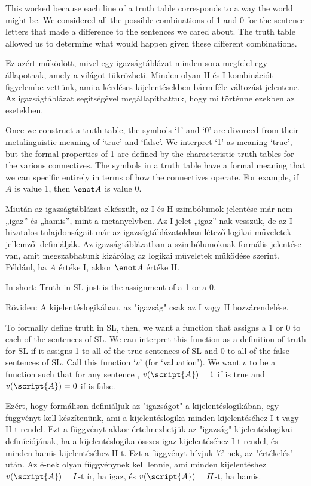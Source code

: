 This worked because each line of a truth table corresponds to a way the world might be. We considered all the possible combinations of 1 and 0 for the sentence letters that made a difference to the sentences we cared about. The truth table allowed us to determine what would happen given these different combinations. 

Ez azért működött, mivel egy igazságtáblázat minden sora megfelel egy állapotnak, amely a világot tükrözheti. Minden olyan H és I kombinációt figyelembe vettünk, ami a kérdéses kijelentésekben bármiféle változást jelentene. Az igazságtáblázat segítségével megállapíthattuk, hogy mi történne ezekben az esetekben.


Once we construct a truth table, the symbols `1' and `0' are divorced from their metalinguistic meaning of `true' and `false'. We interpret `1' as meaning `true', but the formal properties of 1 are defined by the characteristic truth tables for the various connectives. The symbols in a truth table have a formal meaning that we can specific entirely in terms of how the connectives operate. For example, if $A$ is value 1, then $\enot A$ is value 0.

Miután az igazságtáblázat elkészült, az I és H szimbólumok jelentése már nem „igaz” és „hamis”, mint a metanyelvben. Az I jelet „igaz”-nak vesszük, de az I hivatalos tulajdonságait már az igazságtáblázatokban létező logikai műveletek jellemzői definiálják. Az igazságtáblázatban a szimbólumoknak formális jelentése van, amit megszabhatunk kizárólag az logikai műveletek működése szerint. Például, ha $A$ értéke I, akkor $\enot A$ értéke H.


In short: Truth in SL just is the assignment of a 1 or a 0.

Röviden: A kijelentéslogikában, az "igazság" csak az I vagy H hozzárendelése.


To formally define truth in SL, then, we want a function that assigns a 1 or 0 to each of the sentences of SL. We can interpret this function as a definition of truth for SL if it assigns 1 to all of the true sentences of SL and 0 to all of the false sentences of SL. Call this function `$v$' (for `valuation'). We want $v$ to be a function such that for any sentence , $v(\script{A})=1$ if  is true and $v(\script{A})=0$ if  is false.

Ezért, hogy formálisan definiáljuk az "igazságot" a kijelentéslogikában, egy függvényt kell készítenünk, ami a kijelentéslogika minden kijelentéséhez I-t vagy H-t rendel. Ezt a függvényt akkor értelmezhetjük az "igazság" kijelentéslogikai definíciójának, ha a kijelentéslogika összes igaz kijelentéséhez I-t rendel, és minden hamis kijelentéséhez H-t. Ezt a függvényt hívjuk '$é$'-nek, az "értékelés" után. Az $é$-nek olyan függvénynek kell lennie, ami minden  kijelentéshez $v(\script{A})=I$-t ír, ha  igaz, és $v(\script{A})=H$-t, ha  hamis.


